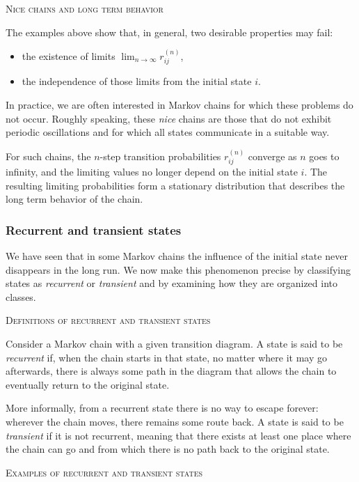 \bigskip
\textsc{Nice chains and long term behavior}

The examples above show that, in general, two desirable properties may fail:
\begin{itemize}
\item the existence of limits \(\lim_{n \to \infty} r_{ij}^{(n)}\),
\item the independence of those limits from the initial state \(i\).
\end{itemize}

In practice, we are often interested in Markov chains for which these problems do not occur.
Roughly speaking, these \textit{nice} chains are those that do not exhibit periodic oscillations and for which all states communicate in a suitable way.

For such chains, the \(n\)-step transition probabilities \(r_{ij}^{(n)}\) converge as \(n\) goes to infinity, and the limiting values no longer depend on the initial state \(i\).
The resulting limiting probabilities form a stationary distribution that describes the long term behavior of the chain.


\subsubsection{Recurrent and transient states}

We have seen that in some Markov chains the influence of the initial state never disappears in the long run.
We now make this phenomenon precise by classifying states as \textit{recurrent} or \textit{transient} and by examining how they are organized into classes.

\bigskip
\textsc{Definitions of recurrent and transient states}

Consider a Markov chain with a given transition diagram.
A state is said to be \textit{recurrent} if, when the chain starts in that state, no matter where it may go afterwards, there is always some path in the diagram that allows the chain to eventually return to the original state.

More informally, from a recurrent state there is no way to escape forever: wherever the chain moves, there remains some route back.
A state is said to be \textit{transient} if it is not recurrent, meaning that there exists at least one place where the chain can go and from which there is no path back to the original state.

\bigskip
\textsc{Examples of recurrent and transient states}

